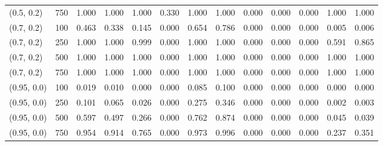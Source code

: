 \begin{table}[ht]
{\begin{tabular}{ll|ccccccccccc}
			(0.5, 0.2) & 750 & 1.000 & 1.000 & 1.000 & 0.330 & 1.000 & 1.000 & 0.000 & 0.000 & 0.000 & 1.000 & 1.000 \\
			(0.7, 0.2) & 100 & 0.463 & 0.338 & 0.145 & 0.000 & 0.654 & 0.786 & 0.000 & 0.000 & 0.000 & 0.005 & 0.006 \\
			(0.7, 0.2) & 250 & 1.000 & 1.000 & 0.999 & 0.000 & 1.000 & 1.000 & 0.000 & 0.000 & 0.000 & 0.591 & 0.865 \\
			(0.7, 0.2) & 500 & 1.000 & 1.000 & 1.000 & 0.000 & 1.000 & 1.000 & 0.000 & 0.000 & 0.000 & 1.000 & 1.000 \\
			(0.7, 0.2) & 750 & 1.000 & 1.000 & 1.000 & 0.000 & 1.000 & 1.000 & 0.000 & 0.000 & 0.000 & 1.000 & 1.000 \\
			(0.95, 0.0) & 100 & 0.019 & 0.010 & 0.000 & 0.000 & 0.085 & 0.100 & 0.000 & 0.000 & 0.000 & 0.000 & 0.000 \\
			(0.95, 0.0) & 250 & 0.101 & 0.065 & 0.026 & 0.000 & 0.275 & 0.346 & 0.000 & 0.000 & 0.000 & 0.002 & 0.003 \\
			(0.95, 0.0) & 500 & 0.597 & 0.497 & 0.266 & 0.000 & 0.762 & 0.874 & 0.000 & 0.000 & 0.000 & 0.045 & 0.039 \\
			(0.95, 0.0) & 750 & 0.954 & 0.914 & 0.765 & 0.000 & 0.973 & 0.996 & 0.000 & 0.000 & 0.000 & 0.237 & 0.351 \\
			\hline
		\end{tabular}
		
	}
\end{table}





